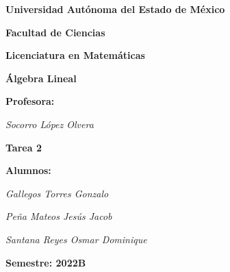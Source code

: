 \documentclass[fleqn]{article}
\begin{document}
    \begin{titlepage}
        \centering
        \vspace{2.7cm}
        {\Huge \textbf{Universidad Autónoma del Estado de México}\par}
        \vspace{0.9cm}

        {\Huge \textbf{Facultad de Ciencias}\par}
        \vspace{0.9cm}

        {\Huge \textbf{Licenciatura en Matemáticas}\par}
        \vspace{1.8cm}

        {\huge \textbf{Álgebra Lineal}\par}
        \vspace{0.7cm}

        {\huge \textbf{Profesora:}\par}
        \vspace{0.3cm}
        {\huge \textsl{Socorro López Olvera}}\par
        \vspace{0.7cm}

        {\huge \textbf{Tarea 2}\par}
        \vspace{0.7cm}

        {\huge \textbf{Alumnos:}\par}
        \vspace{0.3cm}
        {\huge \textsl{Gallegos Torres Gonzalo}}\par
        {\huge \textsl{Peña Mateos Jesús Jacob}}\par
        {\huge \textsl{Santana Reyes Osmar Dominique}}\par
        \vspace{1.8cm}

        {\huge \textbf{Semestre: 2022B}\par}
        \vspace{0.7cm}
        \vfill
        \par
    \end{titlepage}
\end{document}
